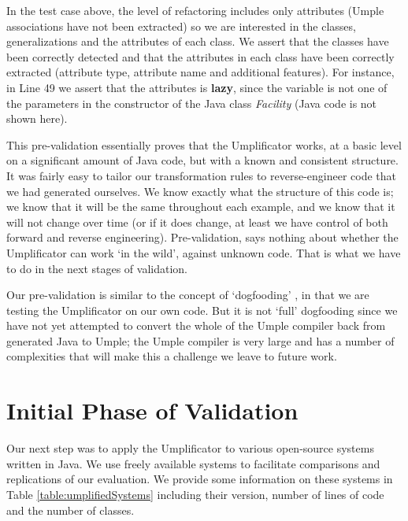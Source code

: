 In the test case above, the level of refactoring includes only attributes (Umple associations have not been extracted) so we are interested in the classes, generalizations and the attributes of each class. We assert that the classes have been correctly detected and that the attributes in each class have been correctly extracted (attribute type, attribute name and additional features). For instance, in Line 49 we assert that the attributes is \textbf{lazy}, since the variable is not one of the parameters in the constructor of the Java class \textit{Facility} (Java code is not shown here).


This pre-validation essentially proves that the Umplificator works, at a basic level on a significant amount of Java code, but with a known and consistent structure. It was fairly easy to tailor our transformation rules to reverse-engineer code that we had generated ourselves. We know exactly what the structure of this code is; we know that it will be the same throughout each example, and we know that it will not change over time (or if it does change, at least we have control of both forward and reverse engineering). Pre-validation, says nothing about whether the Umplificator can work `in the wild', against unknown code. That is what we have to do in the next stages of validation.

Our pre-validation is similar to the concept of `dogfooding' \cite{ash2003web}, in that we are testing the Umplificator on our own code. But it is not `full' dogfooding since we have not yet attempted to convert the whole of the Umple compiler back from generated Java to Umple; the Umple compiler is very large and has a number of complexities that will make this a challenge we leave to future work.



\section{Initial Phase of Validation}

Our next step was to apply the Umplificator to various open-source systems written in Java. We use freely available systems to facilitate comparisons and replications of our evaluation. We provide some information on these systems in Table \ref{table:umplifiedSystems} including their version, number of lines of code and the number of classes.

